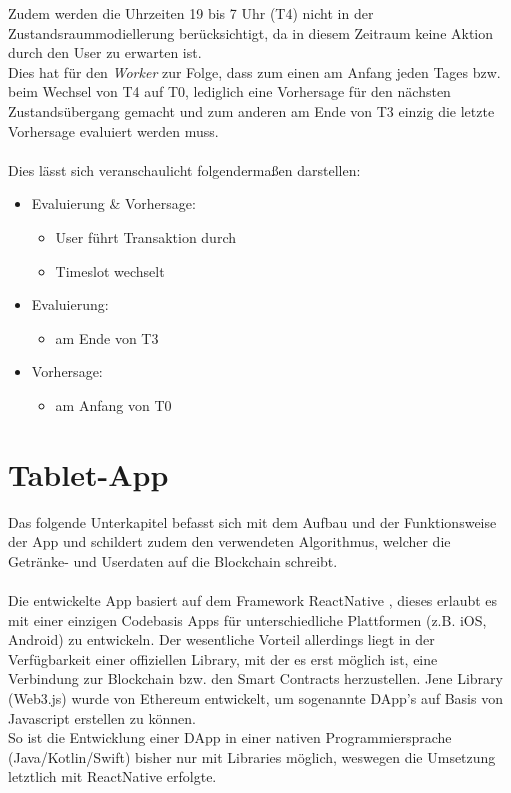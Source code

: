Zudem werden die Uhrzeiten 19 bis 7 Uhr (T4) nicht in der Zustandsraummodiellerung berücksichtigt, da in diesem Zeitraum keine Aktion durch den User zu erwarten ist.\\ 
Dies hat für den \textit{Worker} zur Folge, dass zum einen am Anfang jeden Tages bzw. beim Wechsel von T4 auf T0, lediglich eine Vorhersage für den nächsten Zustandsübergang gemacht und zum anderen am Ende von T3 einzig die letzte Vorhersage evaluiert werden muss.\\\\
Dies lässt sich veranschaulicht folgendermaßen darstellen:
\begin{itemize}
	\item Evaluierung \& Vorhersage: 
	      \begin{itemize}
	      	\item User führt Transaktion durch
	      	\item Timeslot wechselt
	      \end{itemize}
	\item Evaluierung:
	      \begin{itemize}
	      	\item am Ende von T3
	      \end{itemize}
	\item Vorhersage:
	      \begin{itemize}
	      	\item am Anfang von T0
	      \end{itemize}
\end{itemize}    

\newpage
\section{Tablet-App}
\label{sec:app}

Das folgende Unterkapitel befasst sich mit dem Aufbau und der Funktionsweise der App und schildert zudem den verwendeten Algorithmus, welcher die Getränke- und Userdaten auf die Blockchain schreibt.\\\\
Die entwickelte App basiert auf dem Framework ReactNative \cite{RN:ReactNative}, dieses erlaubt es mit einer einzigen Codebasis Apps für unterschiedliche Plattformen (z.B. iOS, Android) zu entwickeln. Der wesentliche Vorteil allerdings liegt in der Verfügbarkeit einer offiziellen Library, mit der es erst möglich ist, eine Verbindung zur Blockchain bzw. den Smart Contracts herzustellen. Jene Library (Web3.js) wurde von Ethereum entwickelt, um sogenannte DApp's auf Basis von Javascript erstellen zu können. \\
So ist die Entwicklung einer DApp in einer nativen Programmiersprache (Java/Kotlin/Swift) bisher nur mit  Libraries möglich, weswegen die Umsetzung letztlich mit ReactNative erfolgte.

